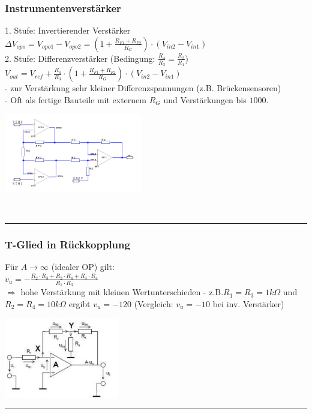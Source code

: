 		\begin{minipage}[c]{12cm}
		\subsubsection{Instrumentenverstärker}
			1. Stufe: Invertierender Verstärker \\
			$\Delta V_{opo}=V_{opo1}-V_{opo2}=(1+\frac{R_{F1}+R_{F2}}{R_G})\cdot(V_{in2}-V_{in1})$
			\smallskip \\
			2. Stufe: Differenzverstärker (Bedingung: $\frac{R_4}{R_3}=\frac{R_2}{R_1}$)\\
			$V_{out}=V_{ref}+\frac{R_4}{R_3}\cdot(1+\frac{R_{F1}+R_{F2}}{R_G})\cdot(V_{in2}-V_{in1})$
			\bigskip \\
			- zur Verstärkung sehr kleiner Differenzspannungen (z.B. Brückensensoren) \\
			- Oft als fertige Bauteile mit externem $R_G$ und Verstärkungen bis $1000$. \\
			\end{minipage}
			\begin{minipage}[c]{6cm}
          		\includegraphics[width=6cm]{./images/instramp.png} 
       	 	\end{minipage}\\
\hrule     
 	 
      	 \begin{minipage}[c]{12cm}	
       	 \subsubsection{T-Glied in Rückkopplung}
       	 	Für $A \to \infty$ (idealer OP) gilt: \smallskip \\
       	 	$v_u=-\frac{R_2 \cdot R_3 + R_2 \cdot R_4 + R_3 \cdot R_4}{R_1 \cdot R_3}$
       	 	\bigskip \\
       	 	$\Longrightarrow$ hohe Verstärkung mit kleinen Wertunterschieden - 
       	 	z.B.$R_1=R_3=1k\Omega$ und $R_2=R_4=10k\Omega$ ergibt $v_u=-120$ 
       	 	(Vergleich: $v_u=-10$ bei inv. Verstärker) \\
       	 \end{minipage}
       	 \begin{minipage}[c]{5cm}
       	 	\includegraphics[width=5cm]{./images/tglied.png}
       	 \end{minipage}   
\hrule   
 	 
